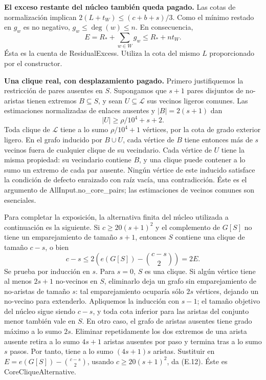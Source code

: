 \documentclass[spanish,11pt,a4paper]{article}
\begin{document}
\textbf{El exceso restante del núcleo también queda pagado.} Las cotas de normalización implican \(2(L+t_W)\le(c+b+s)/3\). Como el mínimo restado en \(g_w\) es no negativo, \(g_w\le\deg(w)\le n\). En consecuencia, \[
E=R_*+\sum_{w\in W}g_w\le R_*+nt_W.
\tag{E.11}
\] Ésta es la cuenta de {\ttfamily\small ResidualExce\discretionary{\hbox{\ensuremath{\hookrightarrow}}}{}{}ss}. Utiliza la cota del mismo \(L\) proporcionado por el constructor.

\textbf{Una clique real, con desplazamiento pagado.} Primero justifiquemos la restricción de pares ausentes en \(S\). Supongamos que \(s+1\) pares disjuntos de no-aristas tienen extremos \(B\subseteq S\), y sean \(U\subseteq\mathcal L\) sus vecinos ligeros comunes. Las estimaciones normalizadas de enlaces ausentes y \(|B|=2(s+1)\) dan \[
|U|\ge\rho/10^4+s+2.
\] Toda clique de \(\mathcal L\) tiene a lo sumo \(\rho/10^4+1\) vértices, por la cota de grado exterior ligero. En el grafo inducido por \(B\cup U\), cada vértice de \(B\) tiene entonces más de \(s\) vecinos fuera de cualquier clique de su vecindario. Cada vértice de \(U\) tiene la misma propiedad: su vecindario contiene \(B\), y una clique puede contener a lo sumo un extremo de cada par ausente. Ningún vértice de este inducido satisface la condición de defecto enraizado con raíz vacía, una contradicción. Éste es el argumento de {\ttfamily\small AllInput.\discretionary{\hbox{\ensuremath{\hookrightarrow}}}{}{}no\_\discretionary{\hbox{\ensuremath{\hookrightarrow}}}{}{}core\_\discretionary{\hbox{\ensuremath{\hookrightarrow}}}{}{}pairs}; las estimaciones de vecinos comunes son esenciales.

Para completar la exposición, la alternativa finita del núcleo utilizada a continuación es la siguiente. Si \(c\ge20(s+1)^2\) y el complemento de \(G[S]\) no tiene un emparejamiento de tamaño \(s+1\), entonces \(S\) contiene una clique de tamaño \(c-s\), o bien \[
c-s\le2\left(e(G[S])-\binom{c-s}{2}\right)=2E.
\tag{E.12}
\] Se prueba por inducción en \(s\). Para \(s=0\), \(S\) es una clique. Si algún vértice tiene al menos \(2s+1\) no-vecinos en \(S\), eliminarlo deja un grafo sin emparejamiento de no-aristas de tamaño \(s\): tal emparejamiento ocuparía sólo \(2s\) vértices, dejando un no-vecino para extenderlo. Apliquemos la inducción con \(s-1\); el tamaño objetivo del núcleo sigue siendo \(c-s\), y toda cota inferior para las aristas del conjunto menor también vale en \(S\). En otro caso, el grafo de aristas ausentes tiene grado máximo a lo sumo \(2s\). Eliminar repetidamente los dos extremos de una arista ausente retira a lo sumo \(4s+1\) aristas ausentes por paso y termina tras a lo sumo \(s\) pasos. Por tanto, tiene a lo sumo \((4s+1)s\) aristas. Sustituir en \(E=e(G[S])-\binom{c-s}{2}\), usando \(c\ge20(s+1)^2\), da (E.12). Éste es {\ttfamily\small CoreCliqueAl\discretionary{\hbox{\ensuremath{\hookrightarrow}}}{}{}ternative}.
\end{document}
